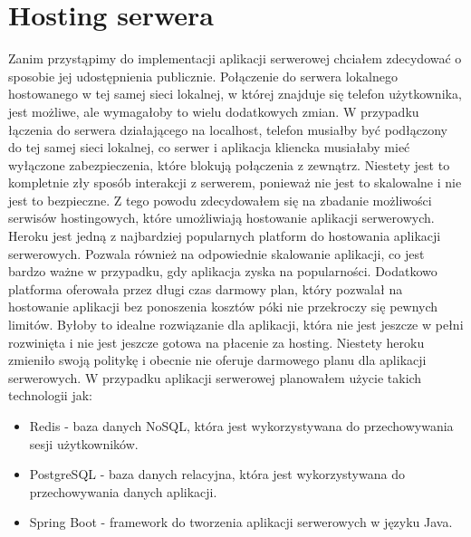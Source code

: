 \section{Hosting serwera}
\label{przygotowania:hosting}
Zanim przystąpimy do implementacji aplikacji serwerowej chciałem zdecydować o sposobie jej udostępnienia publicznie.
Połączenie do serwera lokalnego hostowanego w tej samej sieci lokalnej, w której znajduje się telefon użytkownika, jest możliwe, ale wymagałoby to wielu dodatkowych zmian.
W przypadku łączenia do serwera działającego na localhost, telefon musiałby być podłączony do tej samej sieci lokalnej, co serwer i aplikacja kliencka musiałaby mieć wyłączone zabezpieczenia, które blokują połączenia z zewnątrz.
Niestety jest to kompletnie zły sposób interakcji z serwerem, ponieważ nie jest to skalowalne i nie jest to bezpieczne.
Z tego powodu zdecydowałem się na zbadanie możliwości serwisów hostingowych, które umożliwiają hostowanie aplikacji serwerowych.
Heroku jest jedną z najbardziej popularnych platform do hostowania aplikacji serwerowych.
Pozwala również na odpowiednie skalowanie aplikacji, co jest bardzo ważne w przypadku, gdy aplikacja zyska na popularności.
Dodatkowo platforma oferowała przez długi czas darmowy plan, który pozwalał na hostowanie aplikacji bez ponoszenia kosztów póki nie przekroczy się pewnych limitów.
Byłoby to idealne rozwiązanie dla aplikacji, która nie jest jeszcze w pełni rozwinięta i nie jest jeszcze gotowa na płacenie za hosting.
Niestety heroku zmieniło swoją politykę i obecnie nie oferuje darmowego planu dla aplikacji serwerowych.
\cite{herokuPrice}
W przypadku aplikacji serwerowej planowałem użycie takich technologii jak:
\begin{itemize}
    \item Redis - baza danych NoSQL, która jest wykorzystywana do przechowywania sesji użytkowników.
    \item PostgreSQL - baza danych relacyjna, która jest wykorzystywana do przechowywania danych aplikacji.
    \item Spring Boot - framework do tworzenia aplikacji serwerowych w języku Java.
\end{itemize}

